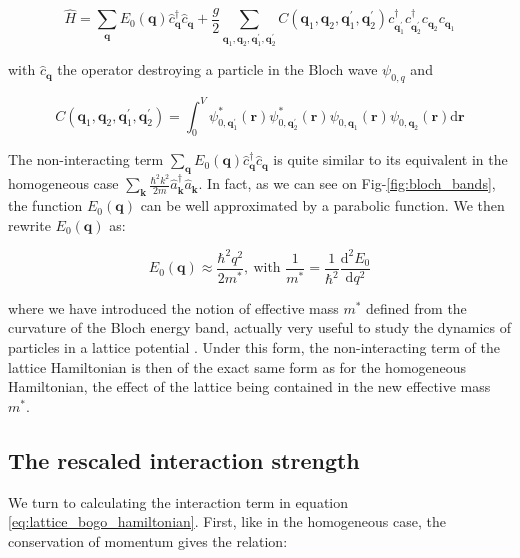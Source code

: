 \begin{equation}
    \hat{H}=\sum_{\bm{q}} E_{0}(\bm{q}) \hat{c}_{\bm{q}}^{\dagger} \hat{c}_{\bm{q}}+\frac{g}{2} \sum_{\bm{q}_{1}, \bm{q}_{2}, \bm{q}_{1}^{\prime}, \bm{q}_{2}^{\prime}} C\left(\bm{q}_{1}, \bm{q}_{2}, \bm{q}_{1}^{\prime}, \bm{q}_{2}^{\prime}\right) c_{\bm{q}_{1}^{\prime}}^{\dagger} c_{\bm{q}_{2}^{\prime}}^{\dagger} c_{\bm{q}_{2}} c_{\bm{q}_{1}}
    \label{eq:lattice_bogo_hamiltonian}
\end{equation}

\noindent with $\hat{c}_{\bm{q}}$ the operator destroying a particle in the Bloch wave $\psi_{0,q}$ and 


\begin{equation}
    C\left(\bm{q}_{1}, \bm{q}_{2}, \bm{q}_{1}^{\prime}, \bm{q}_{2}^{\prime}\right)=\int_{0}^{V} \psi_{0, \bm{q}_{1}^{\prime}}^{*}(\bm{r}) \psi_{0, \bm{q}_{2}^{\prime}}^{*}(\bm{r}) \psi_{0, \bm{q}_{1}}(\bm{r}) \psi_{0, \bm{\bm{q}}_{2}}(\bm{r}) \mathrm{d} \bm{r}
\end{equation}

The non-interacting term $\sum_{\bm{q}} E_{0}(\bm{q}) \hat{c}_{\bm{q}}^{\dagger} \hat{c}_{\bm{q}}$ is quite similar to its equivalent in the homogeneous case $\sum_{\bm{k}}\frac{\hbar^2 k^2}{2m} \hat{a}^{\dagger}_{\bm{k}}  \hat{a}_{\bm{k}}$. In fact, as we can see on Fig-\ref{fig:bloch_bands}, the function $E_{0}(\bm{q})$ can be well approximated by a parabolic function. We then rewrite $E_{0}(\bm{q})$ as:

\begin{equation}
    E_{0}(\bm{q}) \approx \frac{\hbar^2 q^2}{2 m^*}, \ \text{with } \frac{1}{m^*} = \frac{1}{\hbar^2} \frac{\mathrm{d}^2 E_0 }{\mathrm{d}q^2}
\end{equation}

\noindent where we have introduced the notion of effective mass $m^*$ defined from the curvature of the Bloch energy band, actually very useful to study the dynamics of particles in a lattice potential \cite{kramer2002macroscopic,dalibard2013cages}. Under this form, the non-interacting term of the lattice Hamiltonian is then of the exact same form as for the homogeneous Hamiltonian, the effect of the lattice being contained in the new effective mass $m^*$.

\subsection{The rescaled interaction strength}

We turn to calculating the interaction term in equation \ref{eq:lattice_bogo_hamiltonian}. First, like in the homogeneous case, the conservation of momentum gives the relation:

